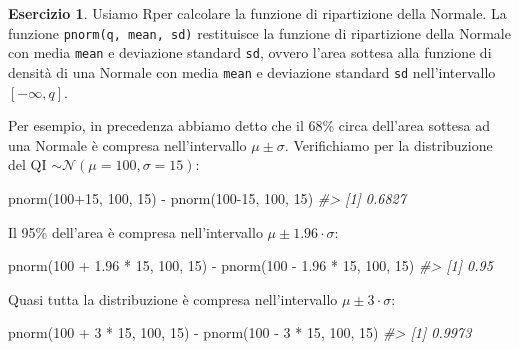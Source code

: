 \documentclass[
  11pt,
]{krantz}
\makeatletter
\newenvironment{Shaded}{\begin{snugshade}}{\end{snugshade}}
\newcommand{\CommentTok}[1]{\textcolor[rgb]{0.37,0.37,0.37}{\textit{#1}}}
\newcommand{\DecValTok}[1]{\textcolor[rgb]{0.06,0.06,0.06}{#1}}
\newcommand{\FloatTok}[1]{\textcolor[rgb]{0.06,0.06,0.06}{#1}}
\newcommand{\FunctionTok}[1]{\textcolor[rgb]{0,0,0}{#1}}
\newcommand{\NormalTok}[1]{#1}
\newcommand{\SpecialCharTok}[1]{\textcolor[rgb]{0,0,0}{#1}}
\newenvironment{kframe}{%
\medskip{}
\setlength{\fboxsep}{.8em}
 \def\at@end@of@kframe{}%
 \ifinner\ifhmode%
  \def\at@end@of@kframe{\end{minipage}}%
  \begin{minipage}{\columnwidth}%
 \fi\fi%
 \def\FrameCommand##1{\hskip\@totalleftmargin \hskip-\fboxsep
 \colorbox{shadecolor}{##1}\hskip-\fboxsep
     \hskip-\linewidth \hskip-\@totalleftmargin \hskip\columnwidth}%
 \MakeFramed {\advance\hsize-\width
   \@totalleftmargin\z@ \linewidth\hsize
   \@setminipage}}%
 {\par\unskip\endMakeFramed%
 \at@end@of@kframe}
\renewenvironment{Shaded}{\begin{kframe}}{\end{kframe}}
\newcommand{\R}{\textsf{R}} %
\theoremstyle{definition}
\theoremstyle{definition}
\theoremstyle{definition}
\newtheorem{exercise}{Esercizio}[chapter]
\theoremstyle{definition}
\theoremstyle{remark}
\makeatother
\begin{document}
\begin{exercise}

Usiamo \R per calcolare la funzione di ripartizione della Normale. La funzione \texttt{pnorm(q,\ mean,\ sd)} restituisce la funzione di ripartizione della Normale con media \texttt{mean} e deviazione standard \texttt{sd}, ovvero l'area sottesa alla funzione di densità di una Normale con media \texttt{mean} e deviazione standard \texttt{sd} nell'intervallo \([-\infty, q]\).

Per esempio, in precedenza abbiamo detto che il 68\% circa dell'area sottesa ad una Normale è compresa nell'intervallo \(\mu \pm \sigma\). Verifichiamo per la distribuzione del QI \(\sim \mathcal{N}(\mu = 100, \sigma = 15)\):

\begin{Shaded}
\begin{Highlighting}[]
\FunctionTok{pnorm}\NormalTok{(}\DecValTok{100}\SpecialCharTok{+}\DecValTok{15}\NormalTok{, }\DecValTok{100}\NormalTok{, }\DecValTok{15}\NormalTok{) }\SpecialCharTok{{-}} \FunctionTok{pnorm}\NormalTok{(}\DecValTok{100{-}15}\NormalTok{, }\DecValTok{100}\NormalTok{, }\DecValTok{15}\NormalTok{)}
\CommentTok{\#\textgreater{} [1] 0.6827}
\end{Highlighting}
\end{Shaded}

Il 95\% dell'area è compresa nell'intervallo \(\mu \pm 1.96 \cdot\sigma\):

\begin{Shaded}
\begin{Highlighting}[]
\FunctionTok{pnorm}\NormalTok{(}\DecValTok{100} \SpecialCharTok{+} \FloatTok{1.96} \SpecialCharTok{*} \DecValTok{15}\NormalTok{, }\DecValTok{100}\NormalTok{, }\DecValTok{15}\NormalTok{) }\SpecialCharTok{{-}} \FunctionTok{pnorm}\NormalTok{(}\DecValTok{100} \SpecialCharTok{{-}} \FloatTok{1.96} \SpecialCharTok{*} \DecValTok{15}\NormalTok{, }\DecValTok{100}\NormalTok{, }\DecValTok{15}\NormalTok{)}
\CommentTok{\#\textgreater{} [1] 0.95}
\end{Highlighting}
\end{Shaded}

Quasi tutta la distribuzione è compresa nell'intervallo \(\mu \pm 3 \cdot\sigma\):

\begin{Shaded}
\begin{Highlighting}[]
\FunctionTok{pnorm}\NormalTok{(}\DecValTok{100} \SpecialCharTok{+} \DecValTok{3} \SpecialCharTok{*} \DecValTok{15}\NormalTok{, }\DecValTok{100}\NormalTok{, }\DecValTok{15}\NormalTok{) }\SpecialCharTok{{-}} \FunctionTok{pnorm}\NormalTok{(}\DecValTok{100} \SpecialCharTok{{-}} \DecValTok{3} \SpecialCharTok{*} \DecValTok{15}\NormalTok{, }\DecValTok{100}\NormalTok{, }\DecValTok{15}\NormalTok{)}
\CommentTok{\#\textgreater{} [1] 0.9973}
\end{Highlighting}
\end{Shaded}

\end{exercise}
\end{document}
